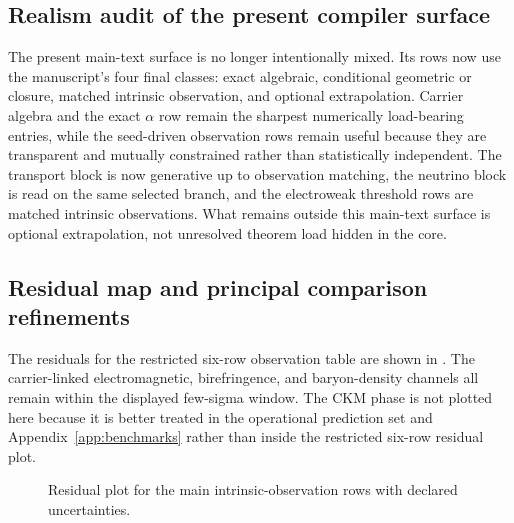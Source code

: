 \subsection{Realism audit of the present compiler surface}

The present main-text surface is no longer intentionally mixed. Its rows now use the manuscript's
four final classes: exact algebraic, conditional geometric or closure, matched intrinsic
observation, and optional extrapolation. Carrier algebra and the exact $\alpha$ row remain the
sharpest numerically load-bearing entries, while the seed-driven observation rows remain useful
because they are transparent and mutually constrained rather than statistically independent. The
transport block is now generative up to observation matching, the neutrino block is read on the
same selected branch, and the electroweak threshold rows are matched intrinsic observations.
What remains outside this main-text surface is optional extrapolation, not unresolved theorem
load hidden in the core.

\subsection{Residual map and principal comparison refinements}

The residuals for the restricted six-row observation table are shown in
. The carrier-linked electromagnetic, birefringence, and baryon-density
channels all remain within the displayed few-sigma window. The CKM phase is not plotted here
because it is better treated in the operational prediction set and Appendix~\ref{app:benchmarks}
rather than inside the restricted six-row residual plot.

\begin{figure}[t]
\centering
{}
\caption{Residual plot for the main intrinsic-observation rows with declared uncertainties.}
\label{fig:residual-plot}
\end{figure}

